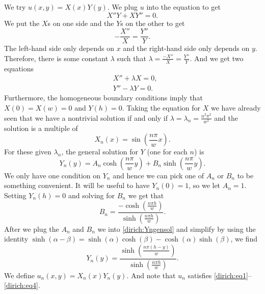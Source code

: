 \documentclass{ximera}
\begin{document}
We try $u(x,y) = X(x)Y(y)$.  We plug $u$ into the equation to get
\begin{equation*}
    X''Y + XY'' = 0 .
\end{equation*}
We put the $X$s on one side and the $Y$s on the other to get
\begin{equation*}
    - \frac{X''}{X} = \frac{Y''}{Y} .
\end{equation*}
The left-hand side only depends on $x$ and the right-hand side only depends on $y$.  Therefore, there is some constant $\lambda$ such that $\lambda = \frac{-X''}{X} = \frac{Y''}{Y}$. And we get two equations
\begin{align*}
    & X'' + \lambda X = 0 , \\
    & Y'' - \lambda Y = 0 .
\end{align*}
Furthermore, the homogeneous boundary conditions imply that $X(0) = X(w) = 0$ and $Y(h) = 0$.  Taking the equation for $X$ we have already seen that we have a nontrivial solution if and only if $\lambda = \lambda_n = \frac{n^2 \pi^2}{w^2}$ and the solution is a multiple of
\begin{equation*}
    X_n(x) = \sin \left( \frac{n \pi}{w} x \right) .
\end{equation*}
For these given $\lambda_n$, the general solution for $Y$ (one for each $n$) is
\begin{equation} \label{dirich:Yngensol}
    Y_n(y) = A_n \cosh \left( \frac{n \pi}{w} y \right) + B_n \sinh \left( \frac{n \pi}{w} y \right) .
\end{equation}
We only have one condition on $Y_n$ and hence we can pick one of $A_n$ or $B_n$ to be something convenient. It will be useful to have $Y_n(0) = 1$, so we let $A_n=1$. Setting $Y_n(h) = 0$ and solving for $B_n$ we get that
\begin{equation*}
    B_n = \frac{- \cosh \left( \frac{n \pi h }{w} \right)}%
    {\sinh \left( \frac{n \pi h }{w} \right)} .
\end{equation*}
After we plug the $A_n$ and $B_n$ we into \eqref{dirich:Yngensol} and simplify by using the identity 
$\sinh(\alpha-\beta) = \sinh(\alpha) \cosh(\beta) - \cosh(\alpha) \sinh(\beta)$, 
we find
\begin{equation*}
    Y_n(y) = \frac{\sinh \left( \frac{n \pi (h-y) }{w} \right)}%
    {\sinh \left( \frac{n \pi h }{w} \right)} .
\end{equation*}
We define $u_n(x,y) = X_n(x)Y_n(y)$. And note that $u_n$ satisfies \eqref{dirich:eq1}--\eqref{dirich:eq4}.
\end{document}
